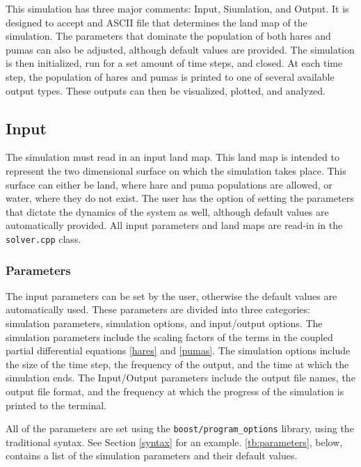 \documentclass[a4paper,11pt]{article}
\begin{document}
{This simulation has three major comments: Input, Siumlation, and Output.  It is designed to accept and ASCII file that determines the land map of the simulation.  The parameters that dominate the population of both hares and pumas can also be adjusted, although default values are provided.  The simulation is then initialized, run for a set amount of time steps, and closed.  At each time step, the population of hares and pumas is printed to one of several available output types.  These outputs can then be visualized, plotted, and analyzed.

\subsection{Input}

The simulation must read in an input land map.  This land map is intended to represent the two dimensional surface on which the simulation takes place.  This surface can either be land, where hare and puma populations are allowed, or water, where they do not exist.  The user has the option of setting the parameters that dictate the dynamics of the system as well, although default values are automatically provided.  All input parameters and land maps are read-in in the \texttt{solver.cpp} class.

\subsubsection{Parameters}\label{params}

The input parameters can be set by the user, otherwise the default values are automatically used.  These parameters are divided into three categories: simulation parameters, simulation options, and input/output options.  The simulation parameters include the scaling factors of the terms in the coupled partial differential equations \eqref{hares} and \eqref{pumas}.  The simulation options include the size of the time step, the frequency of the output, and the time at which the simulation ends.  The Input/Output parameters include the output file names, the output file format, and the frequency at which the progress of the simulation is printed to the terminal.  

All of the parameters are set using the \texttt{boost/program\_options} library, using the traditional syntax.  See Section \ref{syntax} for an example.  \ref{tb:parameters}, below, contains a list of the simulation parameters and their default values.

}
\end{document}
